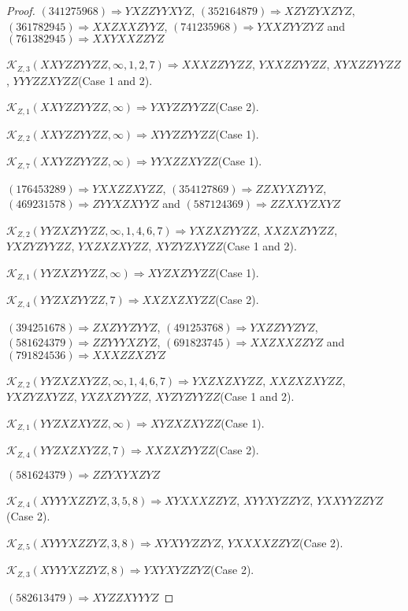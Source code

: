 \documentclass[12pt]{article}
\theoremstyle{plain}
\theoremstyle{definition}
\theoremstyle{remark}
\newcommand{\fancy}[1]{\mathcal{#1}}
\def\K{\fancy{K}}
\begin{document}
\begin{proof}
	$(3 4 1 2 7 5 9 6 8)\Rightarrow YXZZYYXYZ$, $(3 5 2 1 6 4 8 7 9)\Rightarrow XZYZYXZYZ$, $(3 6 1 7 8 2 9 4 5)\Rightarrow XXZXXZYYZ$, $(7 4 1 2 3 5 9 6 8)\Rightarrow YXXZYYZYZ$ and $(7 6 1 3 8 2 9 4 5)\Rightarrow XXYXXZZYZ$
	
	
	$\K_{Z,3}(XXYZZYYZZ,\infty,1, 2, 7)\Rightarrow $$XXXZZYYZZ$, $YXXZZYYZZ$, $XYXZZYYZZ$, $YYYZZXYZZ$(Case 1 and 2).
	
	$\K_{Z,1}(XXYZZYYZZ,\infty)\Rightarrow $$YXYZZYYZZ$(Case 2).
	
	$\K_{Z,2}(XXYZZYYZZ,\infty)\Rightarrow $$XYYZZYYZZ$(Case 1).
	
	$\K_{Z,7}(XXYZZYYZZ,\infty)\Rightarrow $$YYXZZXYZZ$(Case 1).
	
	
	
	$(1 7 6 4 5 3 2 8 9)\Rightarrow YXXZZXYZZ$, $(3 5 4 1 2 7 8 6 9)\Rightarrow ZZXYXZYYZ$, $(4 6 9 2 3 1 5 7 8)\Rightarrow ZYYXZXYYZ$ and $(5 8 7 1 2 4 3 6 9)\Rightarrow ZZXXYZXYZ$
	
	
	$\K_{Z,2}(YYZXZYYZZ,\infty,1, 4, 6, 7)\Rightarrow $$YXZXZYYZZ$, $XXZXZYYZZ$, $YXZYZYYZZ$, $YXZXZXYZZ$, $XYZYZXYZZ$(Case 1 and 2).
	
	$\K_{Z,1}(YYZXZYYZZ,\infty)\Rightarrow $$XYZXZYYZZ$(Case 1).
	
	$\K_{Z,4}(YYZXZYYZZ,7)\Rightarrow $$XXZXZXYZZ$(Case 2).
	
	
	
	$(3 9 4 2 5 1 6 7 8)\Rightarrow ZXZYYZYYZ$, $(4 9 1 2 5 3 7 6 8)\Rightarrow YXZZYYZYZ$, $(5 8 1 6 2 4 3 7 9)\Rightarrow ZZYYYXZYZ$, $(6 9 1 8 2 3 7 4 5)\Rightarrow XXZXXZZYZ$ and $(7 9 1 8 2 4 5 3 6)\Rightarrow XXXZZXZYZ$
	
	
	$\K_{Z,2}(YYZXZXYZZ,\infty,1, 4, 6, 7)\Rightarrow $$YXZXZXYZZ$, $XXZXZXYZZ$, $YXZYZXYZZ$, $YXZXZYYZZ$, $XYZYZYYZZ$(Case 1 and 2).
	
	$\K_{Z,1}(YYZXZXYZZ,\infty)\Rightarrow $$XYZXZXYZZ$(Case 1).
	
	$\K_{Z,4}(YYZXZXYZZ,7)\Rightarrow $$XXZXZYYZZ$(Case 2).
	
	
	
	$(5 8 1 6 2 4 3 7 9)\Rightarrow ZZYXYXZYZ$
	
	
	$\K_{Z,4}(XYYYXZZYZ,3, 5, 8)\Rightarrow $$XYXXXZZYZ$, $XYYXYZZYZ$, $YXXYYZZYZ$(Case 2).
	
	$\K_{Z,5}(XYYYXZZYZ,3, 8)\Rightarrow $$XYXYYZZYZ$, $YXXXXZZYZ$(Case 2).
	
	$\K_{Z,3}(XYYYXZZYZ,8)\Rightarrow $$YXYXYZZYZ$(Case 2).
	
	
	
	$(5 8 2 6 1 3 4 7 9)\Rightarrow XYZZXYYYZ$
	

\end{proof}
\end{document}
